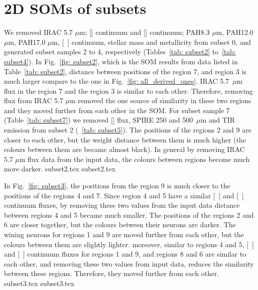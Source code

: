 \newpage
\appendix
\section{2D SOMs of subsets}
\label{sec: app_2d_soms_SOMN}

        We removed IRAC 5.7 $\mu$m; [\sii] continuum and [\oiii] continuum; PAH8.3 $\mu$m, PAH12.0 $\mu$m, PAH17.0 $\mu$m, [~\oiii] continuum, stellar mass and metallicity from subset 0, and generated subset samples 2 to 4, respectively (Tables~\ref{tab: subset2} to~\ref{tab: subset4}).
        In Fig.~\ref{fig: subset2}, which is the SOM results from data listed in Table~\ref{tab: subset2}, distance between positions of the region 7, and region 3 is much larger compare to the one in Fig.~\ref{fig: all_derived_ones}. 
        IRAC 5.7~$\mu$m flux in the region 7 and the region 3 is similar to each other. 
        Therefore, removing flux from IRAC 5.7 $\mu$m removed the one source of similarity in these two regions and they moved further from each other in the SOM.
        For subset sample 7 (Table~\ref{tab: subset7}) we removed [\sii] flux, SPIRE 250 and 500~$\mu$m and TIR emission from subset 2 (~\ref{tab: subset5}).
        The positions of the regions 2 and 9 are closer to each other, but the weight distance between them is much higher (the colours between them are became almost black). 
        In general by removing IRAC 5.7 $\mu$m  flux data from the input data, the colours between regions become much more darker.
        {subset2.tex}
        {subset2.tex}
        
        In Fig.~\ref{fig: subset3}, the positions from the region 9 is much closer to the positions of the regions 4 and 7. 
        Since region 4 and 5 have a similar [~\oiii] and [~\sii] continuum fluxes, by removing these two values from the input data distance between regions 4 and 5 became much smaller.
        The positions of the regions 2 and 6 are closer together, but the colours between their neurons are darker.
        The wining neurons for regions 1 and 9 are moved further from each other, but the colours between them are slightly lighter. 
        moreover, similar to regions 4 and 5, [~\oiii] and [~\sii] continuum fluxes for regions 1 and 9, and regions 8 and 6 are similar to each other, and removing these two values from input data, reduces the similarity between these regions. Therefore, they moved further from each other. 
        {subset3.tex}
        {subset3.tex}
        
